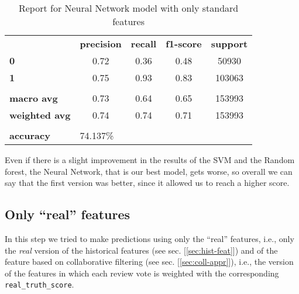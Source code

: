 \begin{table}[h!]
    \centering
    \begin{tabular}{lcccc}
        \rowcolor[HTML]{EEEEEE} 
        \cellcolor[HTML]{FBFBFB} & \textbf{precision} & \textbf{recall} & \textbf{f1-score} & \textbf{support} \\
        \rowcolor[HTML]{EEEEEE} 
        \textbf{0}               & 0.72               & 0.36            & 0.48              & 50930            \\
        \rowcolor[HTML]{EEEEEE} 
        \textbf{1}               & 0.75               & 0.93            & 0.83              & 103063           \\
        \rowcolor[HTML]{FBFBFB} 
        &                    &                 &                   &                  \\
        \rowcolor[HTML]{EEEEEE} 
        \textbf{macro avg}       & 0.73               & 0.64            & 0.65              & 153993           \\
        \rowcolor[HTML]{EEEEEE} 
        \textbf{weighted avg}    & 0.74               & 0.74            & 0.71              & 153993           \\
        \rowcolor[HTML]{FBFBFB} 
        &                    &                 &                   &                  \\
        \rowcolor[HTML]{EEEEEE} 
        \textbf{accuracy}        & \multicolumn{4}{l}{\cellcolor[HTML]{EEEEEE}74.137\%}                         
    \end{tabular}
    \caption{Report for Neural Network model with only standard features}
    \label{tab:nn-res-std}
\end{table}

Even if there is a slight improvement in the results of the SVM and the Random forest, the Neural Network, that is our best model, gets worse, so overall we can say that the first version was better, since it allowed us to reach a higher score.


\newpage
\subsection{Only ``real'' features} \label{sec:only-real}

In this step we tried to make predictions using only the ``real'' features, i.e., only the \textit{real} version of the historical features (see sec. [\ref{sec:hist-feat}]) and of the feature based on collaborative filtering (see sec. [\ref{sec:coll-appr}]), i.e., the version of the features in which each review vote is weighted with the corresponding \texttt{real\_truth\_score}.

